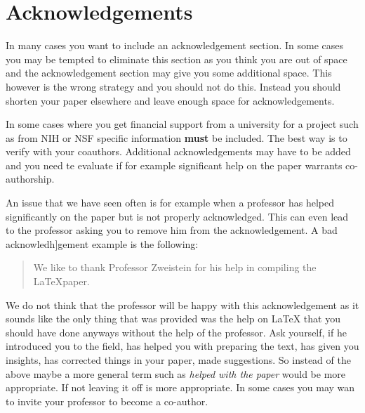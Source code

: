 \FILENAME

\section{Acknowledgements}
\label{S:acknowledgements}

In many cases you want to include an acknowledgement section. In some cases you may be tempted to eliminate this section as you think you are out of space and the acknowledgement section may give you some additional space. This however is the wrong strategy and you should not do this. Instead you should shorten your paper elsewhere and leave enough space for acknowledgements.

In some cases where you get financial support from a university for a project such as from NIH or NSF specific information {\bf must} be included. The best way is to verify with your coauthors. Additional acknowledgements may have to be added and you need te evaluate if for example significant help on the paper warrants co-authorship.

An issue that we have seen often is for example when a professor has helped significantly on the paper but is not properly acknowledged. This can even lead to the professor asking you to remove him from the acknowledgement. A bad acknowledh]gement example is the following:

\begin{quote}
We like to thank Professor Zweistein for his help in compiling  the \LaTeX paper.
\end{quote}

We do not think that the professor will be happy with this acknowledgement as it sounds like the only thing that was provided was the help on LaTeX that you should have done anyways without the help of the professor. Ask yourself, if he introduced you to the field, has helped you with preparing the text, has given you insights, has corrected things in your paper, made suggestions. So instead of the above maybe a more general term such as \textit{helped with the paper} would be more appropriate. If not leaving it off is more appropriate. In some cases you may wan to invite your professor to become a co-author.